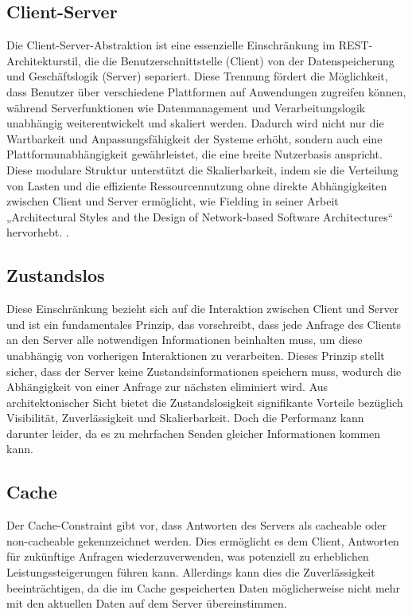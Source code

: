 \documentclass[draft,final]{vutinfth} %
\begin{document}
\subsection{Client-Server}

Die Client-Server-Abstraktion ist eine essenzielle Einschränkung im REST-Architekturstil, die die Benutzerschnittstelle (Client) von der Datenspeicherung und Geschäftslogik (Server) separiert. 
Diese Trennung fördert die Möglichkeit, dass Benutzer über verschiedene Plattformen auf Anwendungen zugreifen können, während Serverfunktionen wie Datenmanagement und Verarbeitungslogik unabhängig weiterentwickelt und skaliert werden. 
Dadurch wird nicht nur die Wartbarkeit und Anpassungsfähigkeit der Systeme erhöht, sondern auch eine Plattformunabhängigkeit gewährleistet, die eine breite Nutzerbasis anspricht. 
Diese modulare Struktur unterstützt die Skalierbarkeit, indem sie die Verteilung von Lasten und die effiziente Ressourcennutzung ohne direkte Abhängigkeiten zwischen Client und Server ermöglicht, wie Fielding in seiner Arbeit „Architectural Styles and the Design of Network-based Software Architectures“ hervorhebt. \cite{Fielding:2000:REST}.


\subsection{Zustandslos}

Diese Einschränkung bezieht sich auf die Interaktion zwischen Client und Server und ist ein fundamentales Prinzip, das vorschreibt, dass jede Anfrage des Clients an den Server alle notwendigen Informationen beinhalten muss, um diese unabhängig von vorherigen Interaktionen zu verarbeiten. 
Dieses Prinzip stellt sicher, dass der Server keine Zustandsinformationen speichern muss, wodurch die Abhängigkeit von einer Anfrage zur nächsten eliminiert wird.
Aus architektonischer Sicht bietet die Zustandslosigkeit signifikante Vorteile bezüglich Visibilität, Zuverlässigkeit und Skalierbarkeit.
Doch die Performanz kann darunter leider, da es zu mehrfachen Senden gleicher Informationen kommen kann. \cite{Fielding:2000:REST}


\subsection{Cache}

Der Cache-Constraint gibt vor, dass Antworten des Servers als cacheable oder non-cacheable gekennzeichnet werden. 
Dies ermöglicht es dem Client, Antworten für zukünftige Anfragen wiederzuverwenden, was potenziell zu erheblichen Leistungssteigerungen führen kann. Allerdings kann dies die Zuverlässigkeit beeinträchtigen, da die im Cache gespeicherten Daten möglicherweise nicht mehr mit den aktuellen Daten auf dem Server übereinstimmen. \cite{Fielding:2000:REST}
\end{document}
